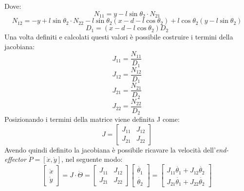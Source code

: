 Dove:
\begin{equation*}
	N_{11} = y-l\sin\theta_2 \cdot N_{21}
\end{equation*}
\begin{equation*}
	N_{12} = -y+l\sin\theta_2 \cdot N_{22} -l\sin\theta_2(x-d-l\cos\theta_2) + l\cos\theta_2(y-l\sin\theta_2)
\end{equation*}
\begin{equation*}
	D_1 = (x-d-l\cos\theta_2)D_2
\end{equation*}
Una volta definiti e calcolati questi valori è possibile costruire i termini della jacobiana:   
\begin{equation*}
    J_{11} = \frac{N_{11}}{D_1}
\end{equation*}
\begin{equation*}
    J_{12} = \frac{N_{12}}{D_1}
\end{equation*}
\begin{equation*}
    J_{21} = \frac{N_{21}}{D_2}
\end{equation*}
\begin{equation*}
    J_{22} = \frac{N_{22}}{D_2}
\end{equation*}
Posizionando i termini della matrice viene definita J come:
\begin{equation}
    J = \begin{bmatrix}
    J_{11} & J_{12} \\ J_{21} & J_{22}
    \end{bmatrix}
    \label{eq:J12}
\end{equation}
Avendo quindi definito la jacobiana è possibile ricavare la velocità dell'\textit{end-effector}  $\dot{P} = [\dot{x},\dot{y}]$, nel seguente modo:
\begin{equation}
	\begin{bmatrix}
		\dot{x} \\ \dot{y}
 	\end{bmatrix} = J \cdot \dot{\Theta} =\begin{bmatrix}
 	J_{11} & J_{12} \\ J_{21} & J_{22}
 \end{bmatrix}
 	\begin{bmatrix}
 		\dot{\theta_1} \\ \dot{\theta_2}
 	\end{bmatrix} = 
 \begin{bmatrix}
 	J_{11}\dot{\theta_1} + J_{12}\dot{\theta_2} \\
 	J_{21}\dot{\theta_1} + J_{22}\dot{\theta_2}
 \end{bmatrix}
\end{equation}
